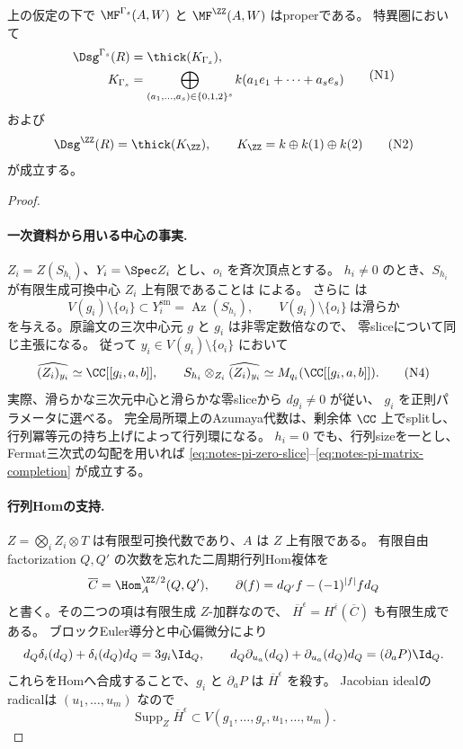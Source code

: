 \begin{proposition}[PIの場合のpropernessと残余体生成]
\label{prop:notes-pi-residue-generator}
上の仮定の下で \(\MF^{\Gamma_s}(A,W)\) と \(\MF^\ZZ(A,W)\) はproperである。
特異圏において
\[
 \begin{aligned}
 \Dsg^{\Gamma_s}(R)&=\thick(K_{\Gamma_s}),\\
 K_{\Gamma_s}&=
 \bigoplus_{(a_1,\ldots,a_s)\in\{0,1,2\}^s}
 k(a_1e_1+\cdots+a_se_s)
 \end{aligned}
 \tag{N1}\label{eq:notes-pi-gamma-generator}
\]
および
\[
 \Dsg^\ZZ(R)=\thick(K_{\ZZ}),\qquad
 K_{\ZZ}=k\oplus k(1)\oplus k(2)
 \tag{N2}\label{eq:notes-pi-z-generator}
\]
が成立する。
\end{proposition}

\begin{proof}
\paragraph{一次資料から用いる中心の事実.}
\(Z_i=Z(S_{h_i})\)、\(Y_i=\Spec Z_i\) とし、\(o_i\) を斉次頂点とする。
\(h_i\ne0\) のとき、\(S_{h_i}\) が有限生成可換中心 \(Z_i\) 上有限であることは
\cite[Theorem 3.7(c), p.~38]{SmithTate} による。
さらに \cite[Theorem 1.3(1),(2a)]{WWY3} は
\[
 V(g_i)\setminus\{o_i\}\subset Y_i^{\mathrm{sm}}
       =\operatorname{Az}(S_{h_i}),\qquad
 V(g_i)\setminus\{o_i\}\ \text{は滑らか}
 \tag{N3}\label{eq:notes-pi-zero-slice}
\]
を与える。原論文の三次中心元 \(g\) と \(g_i\) は非零定数倍なので、
零sliceについて同じ主張になる。
従って \(y_i\in V(g_i)\setminus\{o_i\}\) において
\[
 \widehat{(Z_i)_{y_i}}\simeq\CC[[g_i,a,b]],\qquad
 S_{h_i}\otimes_{Z_i}\widehat{(Z_i)_{y_i}}
       \simeq M_{q_i}(\CC[[g_i,a,b]]).
 \tag{N4}\label{eq:notes-pi-matrix-completion}
\]
実際、滑らかな三次元中心と滑らかな零sliceから \(dg_i\ne0\) が従い、
\(g_i\) を正則パラメータに選べる。
完全局所環上のAzumaya代数は、剰余体 \(\CC\) 上でsplitし、
行列冪等元の持ち上げによって行列環になる。
\(h_i=0\) でも、行列sizeを一とし、Fermat三次式の勾配を用いれば
\eqref{eq:notes-pi-zero-slice}--\eqref{eq:notes-pi-matrix-completion} が成立する。

\paragraph{行列Homの支持.}
\(Z=\bigotimes_i Z_i\otimes T\) は有限型可換代数であり、\(A\) は \(Z\) 上有限である。
有限自由factorization \(Q,Q'\) の次数を忘れた二周期行列Hom複体を
\[
 \overline C=\Hom_A^{\ZZ/2}(Q,Q'),\qquad
 \partial(f)=d_{Q'}f-(-1)^{|f|}fd_Q
\]
と書く。その二つの項は有限生成 \(Z\)-加群なので、
\(\overline H^\epsilon=H^{\bar\epsilon}(\overline C)\) も有限生成である。
ブロックEuler導分と中心偏微分により
\[
 d_Q\delta_i(d_Q)+\delta_i(d_Q)d_Q=3g_i\Id_Q,\qquad
 d_Q\partial_{u_a}(d_Q)+\partial_{u_a}(d_Q)d_Q
       =(\partial_aP)\Id_Q.
\]
これらをHomへ合成することで、\(g_i\) と \(\partial_aP\) は
\(\overline H^\epsilon\) を殺す。
Jacobian idealのradicalは \((u_1,\ldots,u_m)\) なので
\[
 \operatorname{Supp}_Z\overline H^\epsilon
 \subset V(g_1,\ldots,g_r,u_1,\ldots,u_m).
 \tag{N5}\label{eq:notes-pi-support}
\]


\end{proof}
